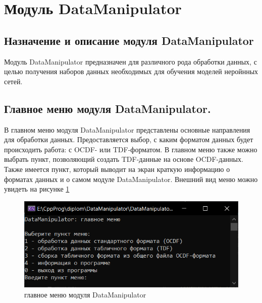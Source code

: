 \sectionbreak \section{ \standartTitleFont
  Модуль DataManipulator
}

\subsection{ \standartTitleFont
  Назначение и описание модуля DataManipulator
} 

{\standartFont

  \par Модуль DataManipulator предназначен для различного рода обработки данных, с целью получения наборов данных необходимых для обучения моделей неройнных сетей. 
  
  \par
}

\subsection{ \standartTitleFont
  Главное меню модуля DataManipulator. 
} 

{\standartFont

  \par В главном меню модуля DataManipulator представлены основные направления для обработки данных. Предоставляется выбор, с каким форматом данных будет происходить работа: с OCDF- или TDF-форматом. В главном меню также можно выбрать пункт, позволяющий создать TDF-данные на основе OCDF-данных. Также имеется пункт, который выводит на экран краткую информацию о форматах данных и о самом модуле DataManipulator. Внешний вид меню можно увидеть на рисунке \ref{fig:mainMenu}
 
  \par

  \begin{figure}[H]
    \centering
    \includegraphics{images/mainMenu.png}
    \caption{главное меню модуля DataManipulator} 
    \label{fig:mainMenu}
  \end{figure}

}

